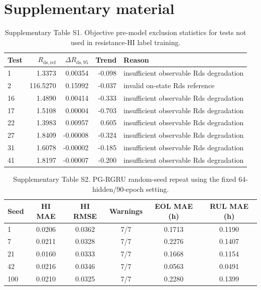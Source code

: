 \documentclass[preprint,12pt]{elsarticle}
\begin{document}
\section*{Supplementary material}

\begin{table}[htbp]
\centering
\footnotesize
\caption{Supplementary Table S1. Objective pre-model exclusion statistics for tests not used in resistance-HI label training.}
\begin{tabularx}{\textwidth}{@{}lrrrX@{}}
\toprule
Test & $R_{\mathrm{ds,ref}}$ & $\Delta R_{\mathrm{ds},95}$ & Trend & Reason \\
\midrule
1 & 1.3373 & 0.00354 & -0.098 & insufficient observable Rds degradation \\
2 & 116.5270 & 0.15992 & -0.037 & invalid on-state Rds reference \\
16 & 1.4890 & 0.00414 & -0.333 & insufficient observable Rds degradation \\
17 & 1.5108 & 0.00004 & -0.703 & insufficient observable Rds degradation \\
22 & 1.3983 & 0.00957 & 0.605 & insufficient observable Rds degradation \\
27 & 1.8409 & -0.00008 & -0.324 & insufficient observable Rds degradation \\
31 & 1.6078 & -0.00002 & -0.185 & insufficient observable Rds degradation \\
41 & 1.8197 & -0.00007 & -0.200 & insufficient observable Rds degradation \\
\bottomrule
\end{tabularx}
\end{table}

\begin{table}[htbp]
\centering
\footnotesize
\caption{Supplementary Table S2. PG-RGRU random-seed repeat using the fixed 64-hidden/90-epoch setting.}
\begin{tabular}{@{}lccccc@{}}
\toprule
Seed & HI MAE & HI RMSE & Warnings & EOL MAE (h) & RUL MAE (h) \\
\midrule
1 & 0.0206 & 0.0362 & 7/7 & 0.1713 & 0.1190 \\
7 & 0.0211 & 0.0328 & 7/7 & 0.2276 & 0.1407 \\
21 & 0.0160 & 0.0333 & 7/7 & 0.1668 & 0.1154 \\
42 & 0.0216 & 0.0346 & 7/7 & 0.0563 & 0.0491 \\
100 & 0.0210 & 0.0325 & 7/7 & 0.2280 & 0.1399 \\
\bottomrule
\end{tabular}
\end{table}
\end{document}
